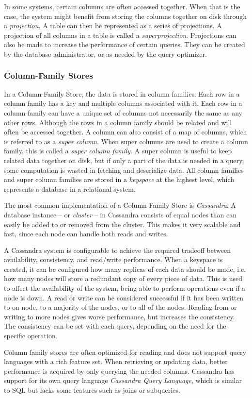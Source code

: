 In some systems, certain columns are often accessed together. When that is the case, the system might benefit from storing the columns together on disk through a \emph{projection}. A table can then be represented as a series of projections. A projection of all columns in a table is called a \emph{superprojection}. Projections can also be made to increase the performance of certain queries. They can be created by the database administrator, or as needed by the query optimizer.

\subsubsection{Column-Family Stores}

In a Column-Family Store, the data is stored in column families. Each row in a column family has a key and multiple columns associated with it. Each row in a column family can have a unique set of columns not necessarily the same as any other rows. Although the rows in a column family should be related and will often be accessed together. A column can also consist of a map of columns, which is referred to as a \emph{super column}. When super columns are used to create a column family, this is called a \emph{super column family}. A super column is useful to keep related data together on disk, but if only a part of the data is needed in a query, some computation is wasted in fetching and deserialize data. All column families and super column families are stored in a \emph{keyspace} at the highest level, which represents a database in a relational system.

The most common implementation of a Column-Family Store is \emph{Cassandra}. A database instance -- or \emph{cluster} -- in Cassandra consists of equal nodes than can easily be added to or removed from the cluster. This makes it very scalable and fast, since each node can handle both reads and writes.

A Cassandra system is configurable to achieve the required tradeoff between availability, consistency, and read/write performance. When a keyspace is created, it can be configured how many replicas of each data should be made, i.e. how many nodes will store a redundant copy of every piece of data. This is used to affect the availability of the system, being able to perform operations even if a node is down. A read or write can be considered successful if it has been written to on node, to a majority of the nodes, or to all of the nodes. Reading from or writing to more nodes gives worse performance, but increases the consistency. The consistency can be set with each query, depending on the need for the specific operation.

Column family stores are often optimized for reading and does not support query languages with a rich feature set. When retrieving or updating data, better performance is acquired by only querying the needed columns. Cassandra has support for its own query language \emph{Cassandra Query Language}, which is similar to SQL but lacks some features such as joins or subqueries.

